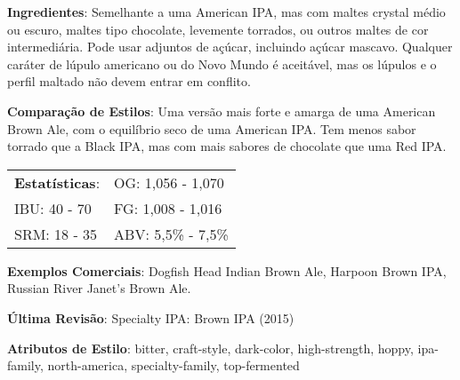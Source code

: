 \textbf{Ingredientes}: Semelhante a uma American IPA, mas com maltes crystal médio ou escuro, maltes tipo chocolate, levemente torrados, ou outros maltes de cor intermediária. Pode usar adjuntos de açúcar, incluindo açúcar mascavo. Qualquer caráter de lúpulo americano ou do Novo Mundo é aceitável, mas os lúpulos e o perfil maltado não devem entrar em conflito.

\textbf{Comparação de Estilos}: Uma versão mais forte e amarga de uma American Brown Ale, com o equilíbrio seco de uma American IPA. Tem menos sabor torrado que a Black IPA, mas com mais sabores de chocolate que uma Red IPA.

\begin{tabular}{@{}p{35mm}p{35mm}@{}}
  \textbf{Estatísticas}: & OG: 1,056 - 1,070 \\
  IBU: 40 - 70  & FG: 1,008 - 1,016 \\
  SRM: 18 - 35  & ABV: 5,5\% - 7,5\%
\end{tabular}

\textbf{Exemplos Comerciais}: Dogfish Head Indian Brown Ale, Harpoon Brown IPA, Russian River Janet’s Brown Ale.

\textbf{Última Revisão}: Specialty IPA: Brown IPA (2015)

\textbf{Atributos de Estilo}: bitter, craft-style, dark-color, high-strength, hoppy, ipa-family, north-america, specialty-family, top-fermented

